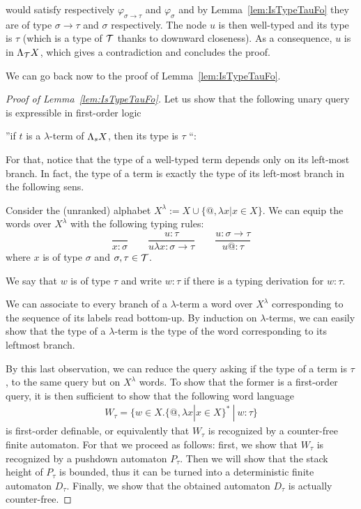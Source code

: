 would satisfy respectively $\varphi_{\sigma\rightarrow\tau}$ and  $\varphi_{\sigma}$ and by Lemma~\ref{lem:IsTypeTauFo} they are of type $\sigma\rightarrow\tau$ and $\sigma$ respectively. The node $u$ is then well-typed and its type is $\tau$ (which is a type of ${\mathcal T}$ thanks to downward closeness). As a consequence, $u$ is in $\Lambda_{{\mathcal T}} X$, which gives a contradiction and concludes the proof.
 \smallskip
 
We can go back now to the proof of Lemma~\ref{lem:IsTypeTauFo}.
\begin{proof}[Proof of Lemma~\ref{lem:IsTypeTauFo}]
Let us show that the following unary query is expressible in first-order logic
\begin{center}
''if $t$ is a $\lambda$-term of $\Lambda_{s} X$, then its type is $\tau$ ``:
\end{center}
 For that, notice that the type of a well-typed term depends only on its left-most branch. In fact, the type of a term is exactly the type of its left-most branch in the following sens.

Consider the (unranked) alphabet $ X^\lambda:= X\cup \{@, \lambda x | x\in X\}$. We can equip the words over $X^\lambda$ with the following typing rules:
$$\frac{}{x: \sigma} \qquad \frac{u:\tau}{u\lambda x: \sigma\rightarrow \tau} \qquad \frac{u:\sigma\rightarrow\tau}{u@:\tau}$$
where $x$ is of type $\sigma$ and $\sigma,\tau \in {\mathcal T}$.

We say that $w$ is of type $\tau$ and write $w:\tau$ if there is a typing derivation for $w:\tau$.

We can associate to every branch of a $\lambda$-term a word over $X^\lambda$ corresponding to the sequence of its labels read bottom-up. By induction on $\lambda$-terms, we can easily show that the type of a $\lambda$-term is the type of the word corresponding to its leftmost branch. 

By this last observation, we can reduce the query asking if the type of a term is $\tau$, to the same query but on $X^\lambda$ words. To show that the former is a first-order query, it is then sufficient to show that the following word language 
\begin{align*}
W_\tau = \{w\in X.\{@, \lambda x | x\in X\}^*\ |\ w:\tau \} 
\end{align*}
is first-order definable, or equivalently that  $W_\tau$ is recognized by a counter-free  finite automaton. For that we proceed as follows: first, we show that $W_\tau$ is recognized by a pushdown automaton $P_\tau$. Then we will show that the stack height of $P_\tau$ is bounded, thus it can be turned into a deterministic finite automaton $D_\tau$. Finally, we show that the obtained automaton $D_\tau$ is actually counter-free.  


\end{proof}
